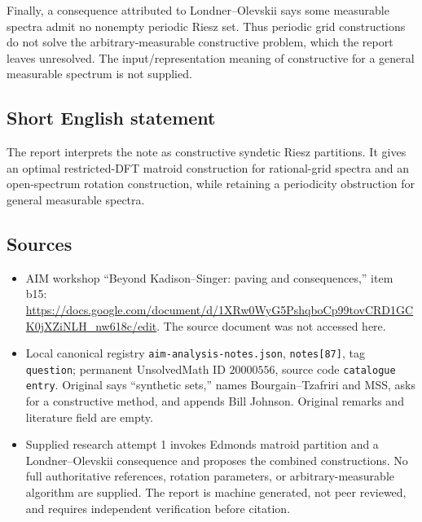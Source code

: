 \documentclass[11pt]{article}
\begin{document}
Finally, a consequence attributed to Londner--Olevskii says some measurable spectra admit no nonempty periodic Riesz set. Thus periodic grid constructions do not solve the arbitrary-measurable constructive problem, which the report leaves unresolved. The input/representation meaning of constructive for a general measurable spectrum is not supplied.
\subsection{Short English statement}
The report interprets the note as constructive syndetic Riesz partitions. It gives an optimal restricted-DFT matroid construction for rational-grid spectra and an open-spectrum rotation construction, while retaining a periodicity obstruction for general measurable spectra.
\subsection{Sources}
\begin{itemize}
\item AIM workshop ``Beyond Kadison--Singer: paving and consequences,'' item b15: \url{https://docs.google.com/document/d/1XRw0WyG5PshqboCp99tovCRD1GCK0jXZiNLH_nw618c/edit}. The source document was not accessed here.
\item Local canonical registry \texttt{aim-analysis-notes.json}, \texttt{notes[87]}, tag \texttt{question}; permanent UnsolvedMath ID \(20000556\), source code \texttt{catalogue entry}. Original says ``synthetic sets,'' names Bourgain--Tzafriri and MSS, asks for a constructive method, and appends Bill Johnson. Original remarks and literature field are empty.
\item Supplied research attempt 1 invokes Edmonds matroid partition and a Londner--Olevskii consequence and proposes the combined constructions. No full authoritative references, rotation parameters, or arbitrary-measurable algorithm are supplied. The report is machine generated, not peer reviewed, and requires independent verification before citation.
\end{itemize}
\end{document}
